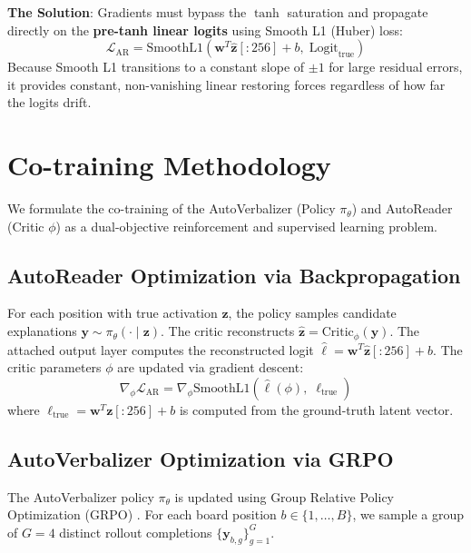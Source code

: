 \documentclass[10pt,twocolumn]{article}
\begin{document}
\textbf{The Solution}: Gradients must bypass the $\tanh$ saturation and propagate directly on the \textbf{pre-tanh linear logits} using Smooth L1 (Huber) loss:
\begin{equation}
    \mathcal{L}_{\text{AR}} = \text{SmoothL1}\left(\mathbf{w}^T \hat{\mathbf{z}}[:256] + b, \; \text{Logit}_{\text{true}}\right)
\end{equation}
Because Smooth L1 transitions to a constant slope of $\pm 1$ for large residual errors, it provides constant, non-vanishing linear restoring forces regardless of how far the logits drift.

\section{Co-training Methodology}

We formulate the co-training of the AutoVerbalizer (Policy $\pi_\theta$) and AutoReader (Critic $\phi$) as a dual-objective reinforcement and supervised learning problem.

\subsection{AutoReader Optimization via Backpropagation}
For each position with true activation $\mathbf{z}$, the policy samples candidate explanations $\mathbf{y} \sim \pi_\theta(\cdot \mid \mathbf{z})$. The critic reconstructs $\hat{\mathbf{z}} = \text{Critic}_\phi(\mathbf{y})$. The attached output layer computes the reconstructed logit $\hat{\ell} = \mathbf{w}^T \hat{\mathbf{z}}[:256] + b$. The critic parameters $\phi$ are updated via gradient descent:
\begin{equation}
    \nabla_\phi \mathcal{L}_{\text{AR}} = \nabla_\phi \text{SmoothL1}\left(\hat{\ell}(\phi), \; \ell_{\text{true}}\right)
\end{equation}
where $\ell_{\text{true}} = \mathbf{w}^T \mathbf{z}[:256] + b$ is computed from the ground-truth latent vector.

\subsection{AutoVerbalizer Optimization via GRPO}
The AutoVerbalizer policy $\pi_\theta$ is updated using Group Relative Policy Optimization (GRPO) \cite{shao2024deepseekmath}. For each board position $b \in \{1, \dots, B\}$, we sample a group of $G=4$ distinct rollout completions $\{\mathbf{y}_{b, g}\}_{g=1}^G$.
\end{document}
